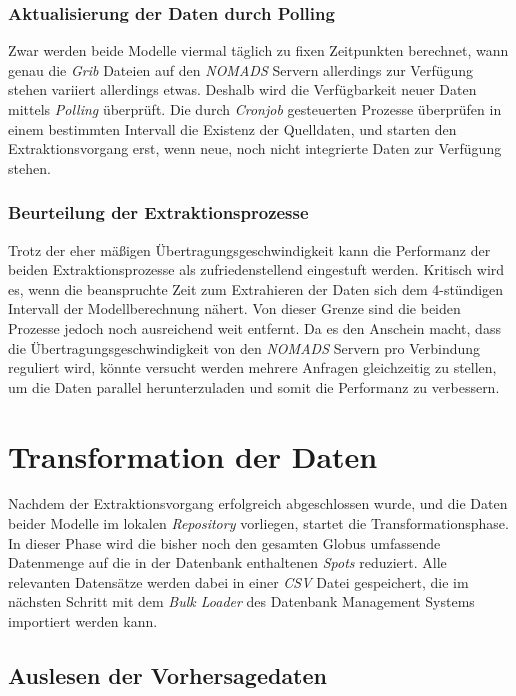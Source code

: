 \subsubsection{Aktualisierung der Daten durch Polling}
Zwar werden beide Modelle viermal täglich zu fixen Zeitpunkten
berechnet, wann genau die \textit{Grib} Dateien auf den
\textit{NOMADS} Servern allerdings zur Verfügung stehen variiert
allerdings etwas. Deshalb wird die Verfügbarkeit neuer Daten mittels
\textit{Polling} überprüft. Die durch \textit{Cronjob} gesteuerten
Prozesse überprüfen in einem bestimmten Intervall die Existenz der
Quelldaten, und starten den Extraktionsvorgang erst, wenn neue, noch
nicht integrierte Daten zur Verfügung stehen.

\subsubsection{Beurteilung der Extraktionsprozesse}
Trotz der eher mäßigen Übertragungsgeschwindigkeit kann die Performanz
der beiden Extraktionsprozesse als zufriedenstellend eingestuft
werden. Kritisch wird es, wenn die beanspruchte Zeit zum Extrahieren
der Daten sich dem 4-stündigen Intervall der Modellberechnung
nähert. Von dieser Grenze sind die beiden Prozesse jedoch noch
ausreichend weit entfernt. Da es den Anschein macht, dass die
Übertragungsgeschwindigkeit von den \textit{NOMADS} Servern pro
Verbindung reguliert wird, könnte versucht werden mehrere Anfragen
gleichzeitig zu stellen, um die Daten parallel herunterzuladen und
somit die Performanz zu verbessern.

\section{Transformation der Daten}
Nachdem der Extraktionsvorgang erfolgreich abgeschlossen wurde, und
die Daten beider Modelle im lokalen \textit{Repository} vorliegen,
startet die Transformationsphase. In dieser Phase wird die bisher noch
den gesamten Globus umfassende Datenmenge auf die in der Datenbank
enthaltenen \textit{Spots} reduziert. Alle relevanten Datensätze
werden dabei in einer \textit{CSV}  Datei gespeichert, die im nächsten Schritt mit dem
\textit{Bulk Loader} des Datenbank Management Systems importiert
werden kann.

\subsection{Auslesen der Vorhersagedaten}
\label{auslesen-der-vorhersagedaten}


